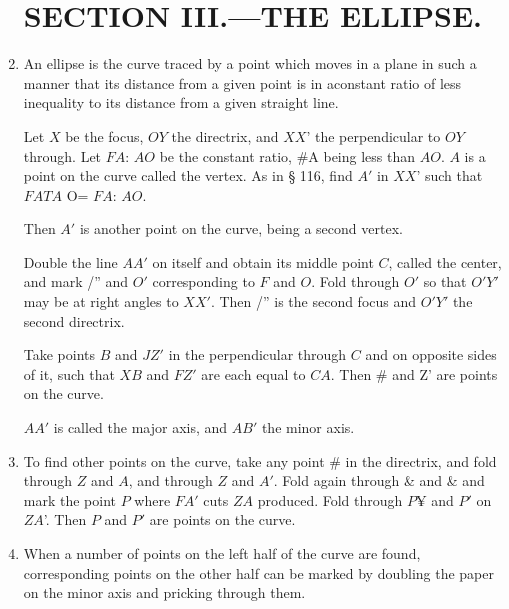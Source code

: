 \begin{enumerate}
\section{SECTION III.—THE ELLIPSE.}

\item An ellipse is the curve traced by a point which moves in a plane in such a
    manner that its distance from a given point is in aconstant ratio of less
    inequality to its distance from a given straight line.


    Let $X$ be the focus, $OY$ the directrix, and $XX$’ the perpendicular to
    $OY$ through.  Let $FA$: $AO$ be the constant ratio, #A being less than
    $AO$.  $A$ is a point on the curve called the vertex.  As in § 116, find
    $A'$ in $XX$’ such that $FATA$ O= $FA$: $AO$.


    Then $A'$ is another point on the curve, being a second vertex.

    Double the line $AA'$ on itself and obtain its middle point $C$, called the
    center, and mark /” and $O'$ corresponding to $F$ and $O$.  Fold through
    $O'$ so that $O'Y'$ may be at right angles to $XX'$. Then /” is the second
    focus and $O'Y'$ the second directrix.



    Take points $B$ and $JZ'$ in the perpendicular through $C$ and on opposite
    sides of it, such that $XB$ and $FZ'$ are each equal to $CA$. Then # and Z’
    are points on the curve.

    $AA'$ is called the major axis, and $AB'$ the minor axis.


\item To find other points on the curve, take any point # in the directrix, and
    fold through $Z$ and $A$, and through $Z$ and $A'$.  Fold again through &
    and & and mark the point $P$ where $FA'$ cuts $ZA$ produced.  Fold through
    $P¥$ and $P'$ on $ZA$'.  Then $P$ and $P'$ are points on the curve.

%
%
%
%
%
%


\item When a number of points on the left half of the curve are found,
    corresponding points on the other half can be marked by doubling the paper
    on the minor axis and pricking through them.


\end{enumerate}
